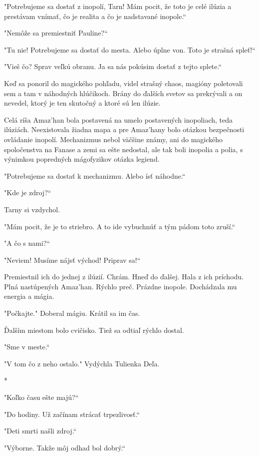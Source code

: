 \documentclass{book}
\begin{document}
"$ $Potrebujeme sa dostať z inopolí, Tarn! Mám pocit, že toto je celé ilúzia a prestávam vnímať, čo je realita a čo je nadstavané inopole.“

"$ $Nemôže sa premiestniť Pauline?“

"$ $Tu nie! Potrebujeme sa dostať do mesta. Alebo úplne von. Toto je strašná spleť!“

"$ $Vieš čo? Sprav veľkú obranu. Ja sa nás pokúsim dostať z tejto splete.“

Keď sa ponoril do magického pohľadu, videl strašný chaos, magióny poletovali sem a tam v náhodných hlúčikoch. Brány do ďalších svetov sa prekrývali a on nevedel, ktorý je ten skutočný a ktoré sú len ilúzie.

Celá ríša Amaz'han bola postavená na umelo postavených inopoliach, teda ilúziách. Neexistovala žiadna mapa a pre Amaz'hany bolo otázkou bezpečnosti ovládanie inopolí. Mechanizmus nebol väčšine známy, ani do magického spoločenstva na Fanase a zemi sa ešte nedostal, ale tak boli inopolia a polia, s výnimkou popredných mágofyzikov otázka legiend.

"$ $Potrebujeme sa dostať k mechanizmu. Alebo ísť náhodne.“

"$ $Kde je zdroj?“

Tarny si vzdychol.

"$ $Mám pocit, že je to striebro. A to ide vybuchnúť a tým pádom toto zruší.“

"$ $A čo s nami?“

"$ $Neviem! Musíme nájsť východ! Priprav sa!“

Premiestnil ich do jednej z ilúzií. Chrám. Hneď do ďalšej. Hala z ich príchodu. Plná nastúpených Amaz'han. Rýchlo preč. Prázdne inopole. Dochádzala mu energia a mágia.

"$ $Počkajte."$ $ Doberal mágiu. Krátil sa im čas.

Ďalším miestom bolo cvičisko. Tiež sa odtiaľ rýchlo dostal.

"$ $Sme v meste.“

"$ $V tom čo z neho ostalo."$ $ Vydýchla Tulienka Deľa.

\begin{center}
*
\end{center}

"$ $Koľko času ešte majú?“

"$ $Do hodiny. Už začínam strácať trpezlivosť.“

"$ $Deti smrti našli zdroj.“

"$ $Výborne. Takže môj odhad bol dobrý.“
\end{document}
